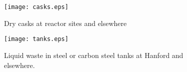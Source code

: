 

  \begin{figure}[htbp!]
    \begin{center}
    \begin{minipage}[t]{0.45\textwidth}
      \texttt{[image: casks.eps]}
      \caption{Dry casks at reactor sites and elsewhere \cite{nrc_dry_2008}}
        \label{fig:casks}
    \end{minipage}
    \hspace{0.01\textwidth}
    \begin{minipage}[t]{0.45\textwidth}
      \texttt{[image: tanks.eps]}
        \caption{Liquid waste in steel or carbon steel tanks at Hanford and 
          elsewhere\cite{doe_underground_????}.}
        \label{fig:tanks}
    \end{minipage}
    \end{center}
  \end{figure}
